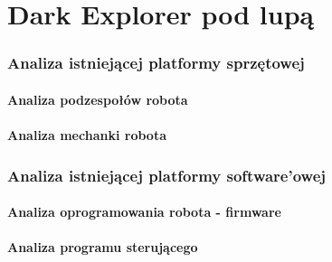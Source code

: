 \newpage
\part{Dark Explorer pod lupą}
\section{Analiza istniejącej platformy sprzętowej}
\subsection{Analiza podzespołów robota}
\subsection{Analiza mechanki robota}
\section{Analiza istniejącej platformy software'owej}
\subsection{Analiza oprogramowania robota - firmware}
\subsection{Analiza programu sterującego}